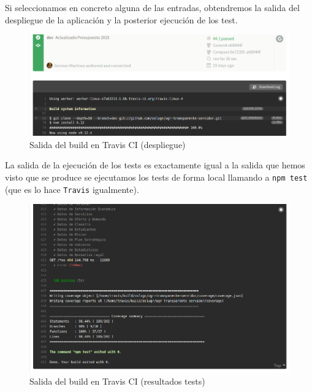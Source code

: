 Si seleccionamos en concreto alguna de las entradas, obtendremos la salida del despliegue de la aplicación y la posterior ejecución de los test.

\begin{figure}[!ht]
	\begin{center}
		\includegraphics[width=1\textwidth]{../images/integracion_continua_02.png}
		\caption{Salida del build en Travis CI (despliegue)}
		\label{fig:integracion_continua_02}
	\end{center}
\end{figure}

La salida de la ejecución de los tests es exactamente igual a la salida que hemos visto que se produce se ejecutamos los tests de forma local llamando a {\tt npm test} (que es lo hace {\tt Travis} igualmente).

\begin{figure}[!ht]
	\begin{center}
		\includegraphics[width=1\textwidth]{../images/integracion_continua_03.png}
		\caption{Salida del build en Travis CI (resultados tests)}
		\label{fig:integracion_continua_03}
	\end{center}
\end{figure}

